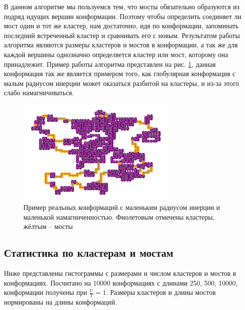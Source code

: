 В данном алгоритме мы пользуемся тем, что мосты обязательно образуются из подряд идущих вершин конформации. Поэтому чтобы определить соединяет ли мост один и тот же кластер, нам достаточно, идя по конформации, запоминать последний встреченный кластер и сравнивать его с новым.
Результатом работы алгоритма являются размеры кластеров и мостов в конформации, а так же для каждой вершины однозначно определяется кластер или мост, которому она принадлежит. Пример работы алгоритма представлен на рис. \ref{fig:clusters_and_bridges}, данная конформация так же является примером того, как глобулярная конформация с малым радиусом инерции может оказаться разбитой на кластеры, и из-за этого слабо намагничиваться.

\begin{figure}[ht]
	\centering
	\includegraphics[width=0.70\textwidth]{../images/bridges_example_1.png}  
	\caption{Пример реальных конформаций с маленьким радиусом инерции и маленькой намагниченностью. Фиолетовым отмечены кластеры, жёлтым -- мосты}
	\label{fig:clusters_and_bridges}
\end{figure}

\subsection{Статистика по кластерам и мостам}
Ниже представлены гистограммы с размерами и числом кластеров и мостов в конформациях. Посчитано на 10000 конформациях с длинами 250, 500, 10000, конформации получены при $\frac{U}{T} = 1$. Размеры кластеров и длины мостов нормированы на длины конформаций. 


